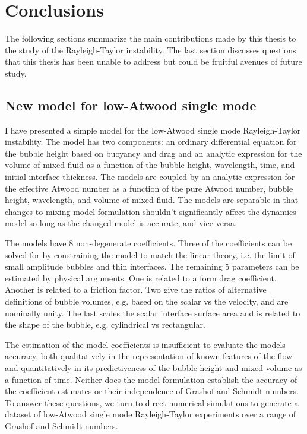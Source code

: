 \chapter{Conclusions}

The following sections summarize the main contributions made by this thesis to the study of the Rayleigh-Taylor instability.
The last section discusses questions that this thesis has been unable to address but could be fruitful avenues of future study.

\section{New model for low-Atwood single mode}
I have presented a simple model for the low-Atwood single mode Rayleigh-Taylor instability.
The model has two components: an ordinary differential equation for the bubble height based on buoyancy and drag and an analytic expression for the volume of mixed fluid as a function of the bubble height, wavelength, time, and initial interface thickness.
The models are coupled by an analytic expression for the effective Atwood number as a function of the pure Atwood number, bubble height, wavelength, and volume of mixed fluid.
The models are separable in that changes to mixing model formulation shouldn't significantly affect the dynamics model so long as the changed model is accurate, and vice versa.

The models have 8 non-degenerate coefficients.
Three of the coefficients can be solved for by constraining the model to match the linear theory, i.e. the limit of small amplitude bubbles and thin interfaces.
The remaining 5 parameters can be estimated by physical arguments.
One is related to a form drag coefficient.
Another is related to a friction factor.
Two give the ratios of alternative definitions of bubble volumes, e.g. based on the scalar vs the velocity, and are nominally unity.
The last scales the scalar interface surface area and is related to the shape of the bubble, e.g. cylindrical vs rectangular.

The estimation of the model coefficients is insufficient to evaluate the models accuracy, both qualitatively in the representation of known features of the flow and quantitatively in its predictiveness of the bubble height and mixed volume as a function of time.
Neither does the model formulation establish the accuracy of the coefficient estimates or their independence of Grashof and Schmidt numbers.
To answer these questions, we turn to direct numerical simulations to generate a dataset of low-Atwood single mode Rayleigh-Taylor experiments over a range of Grashof and Schmidt numbers.

